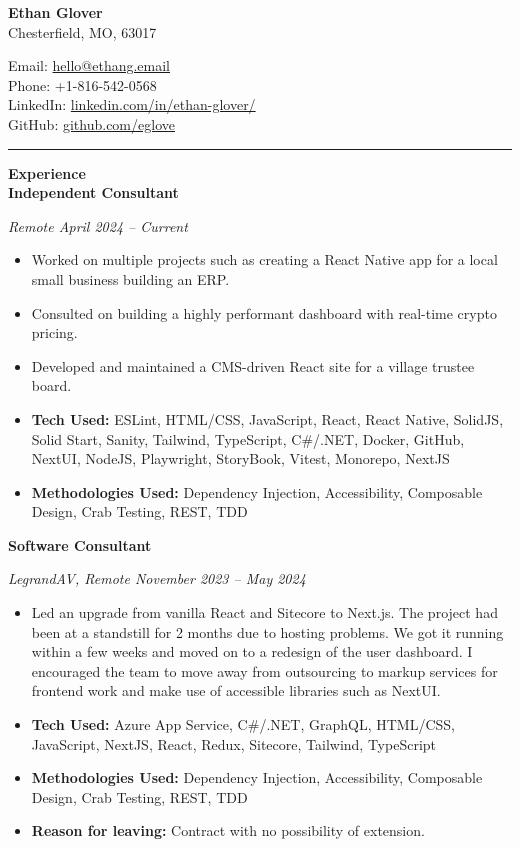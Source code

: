 \documentclass[a4ppaper, 10pt]{article}
\newcommand{\heading}[1]{\vspace{6pt}\noindent\textbf{\large #1}\vspace{4pt}\\}
\newcommand{\subheading}[1]{\vspace{2pt}\noindent\textbf{#1}\par}
\begin{document}
	\begin{center}
		{\LARGE \textbf{Ethan Glover}} \\
		Chesterfield, MO, 63017
		\begin{multicols}{2}
			\raggedright
			Email: \href{mailto:hello@ethang.email}{hello@ethang.email} \\
			Phone: +1-816-542-0568 \\
			LinkedIn: \href{https://www.linkedin.com/in/ethan-glover/}{linkedin.com/in/ethan-glover/} \\
			GitHub: \href{https://github.com/eglove}{github.com/eglove}
		\end{multicols}
	\end{center}
	
	\hrule
	
	\heading{Experience}
	\subheading{Independent Consultant}
	\raggedright
	\textit{Remote \hfill April 2024 -- Current} \\
	\begin{itemize}[itemsep=0pt, topsep=2pt]
		\item Worked on multiple projects such as creating a React Native app for a local small business building an ERP.
		\item Consulted on building a highly performant dashboard with real-time crypto pricing.
		\item Developed and maintained a CMS-driven React site for a village trustee board.
		\item \textbf{Tech Used:} ESLint, HTML/CSS, JavaScript, React, React Native, SolidJS, Solid Start, Sanity, Tailwind, TypeScript, C\#/.NET, Docker, GitHub, NextUI, NodeJS, Playwright, StoryBook, Vitest, Monorepo, NextJS
		\item \textbf{Methodologies Used:} Dependency Injection, Accessibility, Composable Design, Crab Testing, REST, TDD
	\end{itemize}
	
	\subheading{Software Consultant}
	\raggedright
	\textit{LegrandAV, Remote \hfill November 2023 -- May 2024}
	\begin{itemize}[itemsep=0pt, topsep=2pt]
		\item Led an upgrade from vanilla React and Sitecore to Next.js. The project had been at a standstill for 2 months due to hosting problems. We got it running within a few weeks and moved on to a redesign of the user dashboard. I encouraged the team to move away from outsourcing to markup services for frontend work and make use of accessible libraries such as NextUI.
		\item \textbf{Tech Used:} Azure App Service, C\#/.NET, GraphQL, HTML/CSS, JavaScript, NextJS, React, Redux, Sitecore, Tailwind, TypeScript
		\item \textbf{Methodologies Used:} Dependency Injection, Accessibility, Composable Design, Crab Testing, REST, TDD
		\item \textbf{Reason for leaving:} Contract with no possibility of extension.
	\end{itemize}
	
\end{document}

